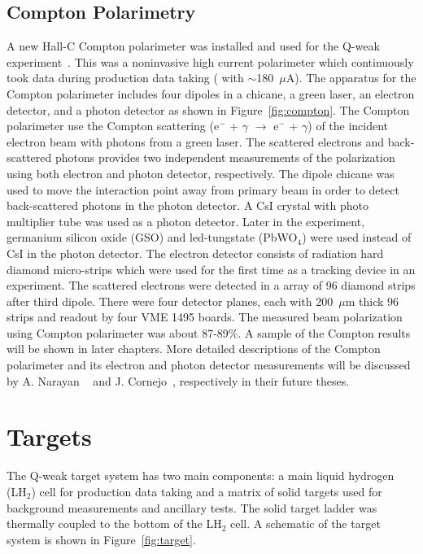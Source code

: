 \subsection{Compton Polarimetry}%
\label{Compton Polarimetry}

A new Hall-C Compton polarimeter was installed and used for the Q-weak experiment~\cite{presentation:amar_compton_1732}. This was a noninvasive high current polarimeter which continuously took data during production data taking ( with $\sim$180~$\mu$A). The apparatus for the Compton polarimeter includes four dipoles in a chicane, a green laser, an electron detector, and a photon detector as shown in Figure~\ref{fig:compton}. The Compton polarimeter use the Compton scattering (e$^{-}$ + $\gamma$ $\rightarrow$ e$^{-}$ + $\gamma$) of the incident electron beam with photons from a green laser. The scattered electrons and back-scattered photons provides two independent measurements of the polarization using  both electron and photon detector, respectively. The dipole chicane was used to move the interaction point away from primary beam in order to detect back-scattered photons in the photon detector. A CsI crystal with photo multiplier tube was used as a photon detector. Later in the experiment, germanium silicon oxide (GSO) and led-tungstate (PbWO$_{4}$) were used instead of CsI in the photon detector. The electron detector consists of radiation hard diamond micro-strips which were used for the first time as a tracking device in an experiment. The scattered electrons were detected in a array of 96 diamond strips after third dipole. There were four detector planes, each with 200~$\mu$m thick 96 strips and readout by four VME 1495 boards. The measured beam polarization using Compton polarimeter was about 87-89\%. A sample of the Compton results will be shown in later chapters. More detailed descriptions of the Compton polarimeter and its electron and photon detector measurements will be discussed by A. Narayan ~\cite{amar_compton_thesis} and J. Cornejo~\cite{carlos_compton_thesis}, respectively in their future theses.


\section{Targets}%
\label{Targets}

The Q-weak target system has two main components: a main liquid hydrogen (LH$_{2}$) cell for production data taking and a matrix of solid targets used for background measurements and ancillary tests.  The solid target ladder was thermally coupled to the bottom of the LH$_{2}$ cell. A schematic of the target system is shown in Figure~\ref{fig:target}.



